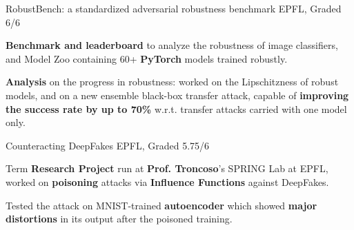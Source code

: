 

\begin{cventries}
  \cventry
  {RobustBench: a standardized adversarial robustness benchmark} %
  {} %
  {} %
  {EPFL, Graded 6/6} %
  {
    \begin{cvitems} %
      \item \textbf{Benchmark and leaderboard} to analyze the robustness of image classifiers, and Model Zoo containing 60+ \textbf{PyTorch} models trained robustly.
      \item \textbf{Analysis} on the progress in robustness: worked on the Lipschitzness of robust models, and on a new ensemble black-box transfer attack, capable of \textbf{improving the success rate by up to 70\%} w.r.t. transfer attacks carried with one model only.
    \end{cvitems}
  }
  
  \cventry
  {Counteracting DeepFakes} %
  {} %
  {} %
  {EPFL, Graded 5.75/6} %
  {
    \begin{cvitems} %
      \item Term \textbf{Research Project} run at \textbf{Prof. Troncoso}'s SPRING Lab at EPFL, worked on \textbf{poisoning} attacks via \textbf{Influence Functions} against DeepFakes.
      \item Tested the attack on MNIST-trained \textbf{autoencoder} which showed \textbf{major distortions} in its output after the poisoned training.
    \end{cvitems}
  }
  

\end{cventries}
